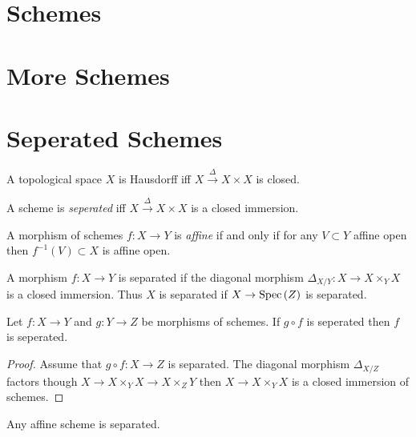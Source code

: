\documentclass[12pt]{article}
\begin{document}
\section{Schemes}

\section{More Schemes}

\section{Seperated Schemes}

\begin{lemma}
A topological space $X$ is Hausdorff iff $X \xrightarrow{\Delta} X \times X$ is closed. 
\end{lemma}

\begin{definition}
A scheme is \textit{seperated} iff $X \xrightarrow{\Delta} X \times X$ is a closed immersion. 
\end{definition}

\begin{definition}
A morphism of schemes $f : X \to Y$ is \textit{affine} if and only if for any $V \subset Y$ affine open then $f^{-1}(V) \subset X$ is affine open. 
\end{definition}

\begin{definition}
A morphism $f : X \to Y$ is separated if the diagonal morphism $\Delta_{X/Y} : X \to X \times_Y X$ is a closed immersion. Thus $X$ is separated if $X \to \mathrm{Spec}\left( Z \right)$ is separated. 
\end{definition}

\begin{proposition}
Let $f : X \to Y$ and $g : Y \to Z$ be morphisms of schemes. If $g \circ f$ is seperated then $f$ is seperated.
\end{proposition}

\begin{proof}
Assume that $g \circ f : X \to Z$ is separated. The diagonal morphism $\Delta_{X/Z}$ factors though $X \to X \times_Y X \to X \times_Z Y$ then $X \to X \times_Y X$ is a closed immersion of schemes.
\end{proof}

\begin{proposition}
Any affine scheme is separated. 
\end{proposition}
\end{document}
